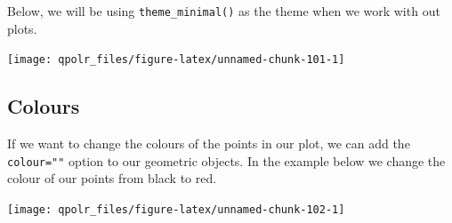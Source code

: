 \documentclass[12pt,oneside]{reedthesis}
\theoremstyle{definition}
\theoremstyle{definition}
\theoremstyle{definition}
\theoremstyle{remark}
\begin{document}
  Below, we will be using \texttt{theme\_minimal()} as the theme when we
  work with out plots.
  \begin{Shaded}
  \begin{Highlighting}[]
  \NormalTok{(}\OperatorTok{+}
  \StringTok{  }\NormalTok{(} \NormalTok{) }\OperatorTok{+}\StringTok{ }
  \StringTok{  }\NormalTok{(}\NormalTok{, }\NormalTok{) }\OperatorTok{+}
  \StringTok{  }\NormalTok{()}
  \end{Highlighting}
  \end{Shaded}
  \begin{center}\texttt{[image: qpolr\_files/figure-latex/unnamed-chunk-101-1]} \end{center}
  
  \subsection{Colours}\label{colours}
  
  If we want to change the colours of the points in our plot, we can add
  the \texttt{colour=""} option to our geometric objects. In the example
  below we change the colour of our points from black to red.
  \begin{Shaded}
  \begin{Highlighting}[]
  \NormalTok{(}\OperatorTok{+}
  \StringTok{  }\NormalTok{(} \NormalTok{, }\NormalTok{) }\OperatorTok{+}\StringTok{ }
  \StringTok{  }\NormalTok{(}\NormalTok{, }\NormalTok{) }\OperatorTok{+}
  \StringTok{  }\NormalTok{()}
  \end{Highlighting}
  \end{Shaded}
  \begin{center}\texttt{[image: qpolr\_files/figure-latex/unnamed-chunk-102-1]} \end{center}
  
\end{document}
